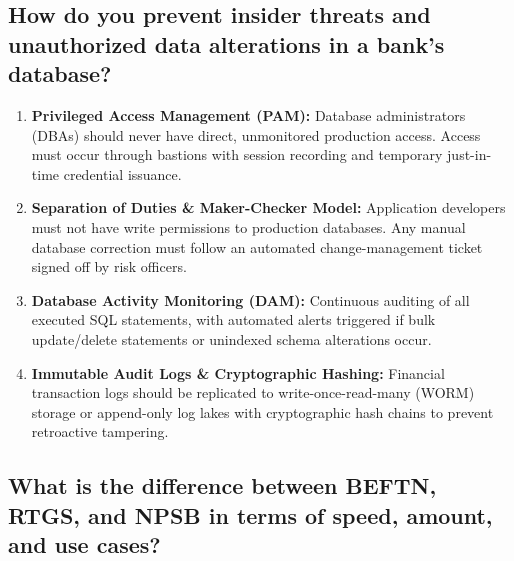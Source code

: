 \medskip

\subsection{How do you prevent insider threats and unauthorized data alterations in a bank's database?}

\begin{enumerate}
  \item \textbf{Privileged Access Management (PAM):} Database administrators (DBAs) should never have direct, unmonitored production access. Access must occur through bastions with session recording and temporary just-in-time credential issuance.
  \item \textbf{Separation of Duties \& Maker-Checker Model:} Application developers must not have write permissions to production databases. Any manual database correction must follow an automated change-management ticket signed off by risk officers.
  \item \textbf{Database Activity Monitoring (DAM):} Continuous auditing of all executed SQL statements, with automated alerts triggered if bulk update/delete statements or unindexed schema alterations occur.
  \item \textbf{Immutable Audit Logs \& Cryptographic Hashing:} Financial transaction logs should be replicated to write-once-read-many (WORM) storage or append-only log lakes with cryptographic hash chains to prevent retroactive tampering.
\end{enumerate}

\medskip

\subsection{What is the difference between BEFTN, RTGS, and NPSB in terms of speed, amount, and use cases?}

